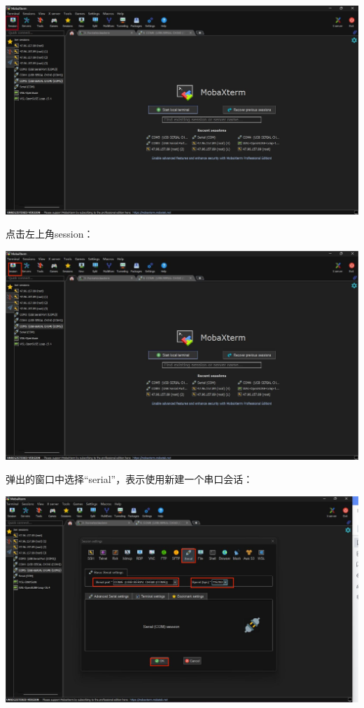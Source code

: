 {\begin{enumerate}
	\centering
	\includegraphics[width=0.9\linewidth]{figures/08-02-MobaXterm界面.jpg}
	
	
	\raggedright
	
	点击左上角session：
	
	\centering
	\includegraphics[width=0.9\linewidth]{figures/08-02-session.jpg}
	
	
	\raggedright
	
	弹出的窗口中选择“serial”，表示使用新建一个串口会话：
	
	\centering
	\includegraphics[width=0.9\linewidth]{figures/08-02-串口设置.jpg}
	

\end{enumerate}}
